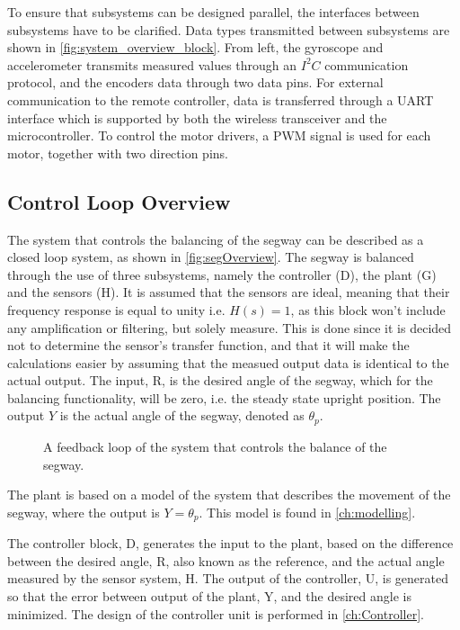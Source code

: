 To ensure that subsystems can be designed parallel, the interfaces between subsystems have to be clarified. Data types transmitted between subsystems are shown in \autoref{fig:system_overview_block}. From left, the gyroscope and accelerometer transmits measured values through an $I^{2}C$ communication protocol, and the encoders data through two data pins. For external communication to the remote controller, data is transferred through a UART interface which is supported by both the wireless transceiver and the microcontroller. To control the motor drivers, a PWM signal is used for each motor, together with two direction pins.

\subsection{Control Loop Overview}\label{controlLoopOverview}
The system that controls the balancing of the segway can be described as a closed loop system, as shown in \autoref{fig:segOverview}. The segway is balanced through the use of three subsystems, namely the controller (D), the plant (G) and the sensors (H). It is assumed that the sensors are ideal, meaning that their frequency response is equal to unity i.e. $H(s) = 1$, as this block won't include any amplification or filtering, but solely measure. This is done since it is decided not to determine the sensor's transfer function, and that it will make the calculations easier by assuming that the measued output data is identical to the actual output. The input, R, is the desired angle of the segway, which for the balancing functionality, will be zero, i.e. the steady state upright position. The output $Y$ is the actual angle of the segway, denoted as $\theta_p$.

\begin{figure}[H]
\centering

\caption{A feedback loop of the system that controls the balance of the segway.}
\label{fig:segOverview}
\end{figure}

The plant is based on a model of the system that describes the movement of the segway, where the output is $Y = \theta_p$. This model is found in \autoref{ch:modelling}. %

The controller block, D, generates the input to the plant, based on the difference between the desired angle, R, also known as the reference, and the actual angle measured by the sensor system, H. The output of the controller, U, is generated so that the error between output of the plant, Y, and the desired angle is minimized. The design of the controller unit is performed in \autoref{ch:Controller}.

